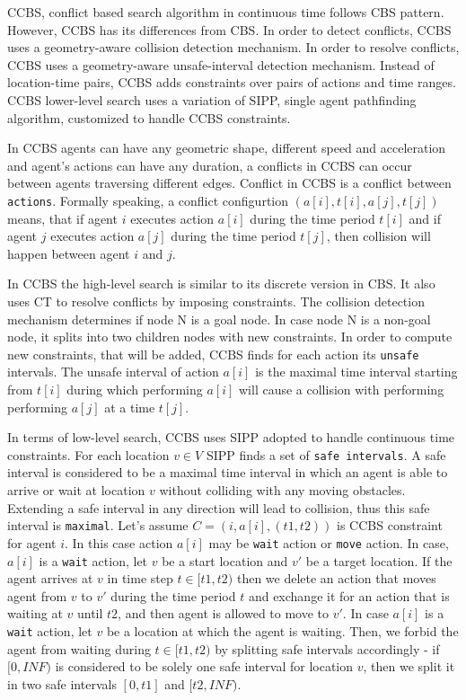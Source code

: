 \documentclass[thesis=B,english]{FITthesis}[2019/12/23]
\begin{document}
CCBS, conflict based search algorithm in continuous time follows CBS pattern. However,
CCBS has its differences from CBS. In order to detect conflicts, CCBS uses a geometry-aware
collision detection mechanism. In order to resolve conflicts, CCBS uses a geometry-aware unsafe-interval detection mechanism. Instead of location-time pairs, CCBS adds constraints 
over pairs of actions and time ranges. CCBS lower-level search uses a variation of SIPP, single agent pathfinding algorithm, customized to handle CCBS constraints.

In CCBS agents can have any geometric shape, different speed and acceleration and agent's actions can have any duration, a conflicts in CCBS can occur between agents traversing different edges. Conflict in CCBS is a conflict between \verb|actions|. Formally speaking, a conflict configurtion $(a[i], t[i], a[j], t[j])$ means, that if agent $i$ executes action $a[i]$ during the time period $t[i]$ and if agent $j$ executes action $a[j]$ during the time period $t[j]$, then collision will happen between agent $i$ and $j$.

In CCBS the high-level search is similar to its discrete version in CBS. It also uses CT to resolve conflicts by imposing constraints. The collision detection mechanism determines if node N is a goal node. In case node N is a non-goal node, it splits into two children nodes with new constraints. In order to compute new constraints, that will be added, CCBS finds for each action its \verb|unsafe| intervals. The unsafe interval of action $a[i]$ is the maximal time interval starting from $t[i]$ during which performing $a[i]$ will cause a collision with performing performing $a[j]$ at a time $t[j]$. 

In terms of low-level search, CCBS uses SIPP adopted to handle continuous time constraints.
For each location $v \in V$ SIPP finds a set of \verb|safe intervals|. A safe interval is considered to be a maximal time interval in which an agent is able to arrive or wait at location $v$ without colliding with any moving obstacles. Extending a safe interval in any direction will lead to collision, thus this safe interval is \verb|maximal|. Let's assume 
$C = (i, a[i], (t1, t2))$ is CCBS constraint for agent $i$. In this case action $a[i]$ may be \verb|wait| action or \verb|move| action. In case, $a[i]$ is a \verb|wait| action, let
$v$ be a start location and $v'$ be a target location. If the agent arrives at $v$ in time step $t \in [t1, t2)$ then we delete an action that moves agent from $v$ to $v'$ during the time period $t$ and exchange it for an action that is waiting at $v$ until $t2$, and then agent is allowed to move to $v'$. In case $a[i]$ is a \verb|wait| action, let $v$ be a location at which the agent is waiting. Then, we forbid the agent from waiting during $t \in [t1, t2)$ by splitting safe intervals accordingly - if $[0, INF)$ is considered to be solely one safe interval for location $v$, then we split it in two safe intervals $[0, t1]$ and $[t2, INF)$.   
\end{document}
